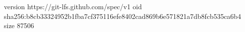 version https://git-lfs.github.com/spec/v1
oid sha256:b8cb33324952b1fba7cf375116efe8402cad869b6e571821a7db8fcb535ca6b4
size 87506
